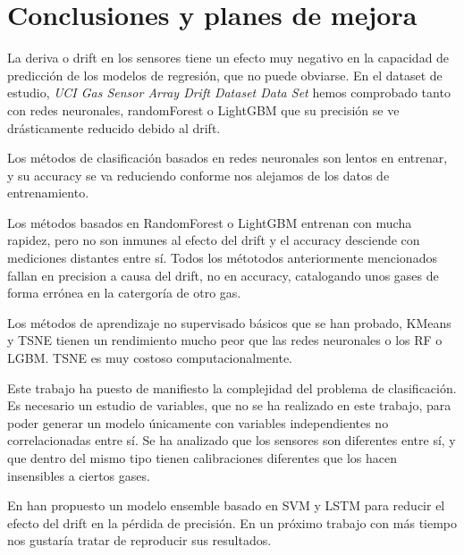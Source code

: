 \chapter{Conclusiones y planes de mejora}

La deriva o drift en los sensores tiene un efecto muy negativo en la capacidad de predicción de los modelos de regresión, que no puede obviarse. En el dataset de estudio, \emph{UCI Gas Sensor Array Drift Dataset Data Set} hemos comprobado tanto con redes neuronales, randomForest o LightGBM que su precisión se ve drásticamente reducido debido al drift. 

Los métodos de clasificación basados en redes neuronales son lentos en entrenar, y su accuracy se va reduciendo conforme nos alejamos de los datos de entrenamiento.

Los métodos basados en RandomForest o LightGBM entrenan con mucha rapidez, pero no son inmunes al efecto del drift y el accuracy desciende con mediciones distantes entre sí. 
Todos los métotodos anteriormente mencionados fallan en precision a causa del drift, no en accuracy, catalogando unos gases de forma errónea en la catergoría de otro gas. 

Los métodos de aprendizaje no supervisado básicos que se han probado, KMeans y TSNE tienen un rendimiento mucho peor que las redes neuronales o los RF o LGBM. TSNE es muy costoso computacionalmente.

Este trabajo ha puesto de manifiesto la complejidad del problema de clasificación. Es necesario un estudio de variables, que no se ha realizado en este trabajo, para poder generar un modelo únicamente con variables independientes no correlacionadas entre sí. Se ha analizado que los sensores son diferentes entre sí, y que dentro del mismo tipo tienen calibraciones diferentes que los hacen insensibles a ciertos gases.  

 En \cite{Zhao2019} han propuesto un modelo ensemble basado en SVM y LSTM para reducir el efecto del drift en la pérdida de precisión. En un próximo trabajo con más tiempo nos gustaría tratar de reproducir sus resultados. 